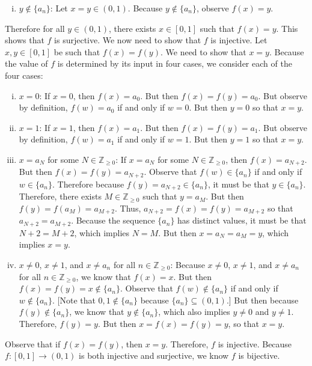 \documentclass[11pt,letterpaper]{article}
\begin{document}
\begin{enumerate}[(a)]
\begin{enumerate}[(i)]
	\item $y \notin \{ a_n \}$: Let $x= y \in (0, 1)$. Because $y \notin \{ a_n \}$, observe $f(x)= y$. 
	\end{enumerate}
Therefore for all $y \in (0, 1)$, there exists $x \in [0, 1]$ such that $f(x)= y$. This shows that $f$ is surjective. We now need to show that $f$ is injective. Let $x, y \in [0, 1]$ be such that $f(x)= f(y)$. We need to show that $x= y$. Because the value of $f$ is determined by its input in four cases, we consider each of the four cases:
	\begin{enumerate}[(i)]
	\item $x= 0$: If $x= 0$, then $f(x)= a_0$. But then $f(x)= f(y)= a_0$. But observe by definition, $f(w)= a_0$ if and only if $w= 0$. But then $y= 0$ so that $x= y$. 
	\item $x= 1$: If $x= 1$, then $f(x)= a_1$. But then $f(x)= f(y)= a_1$. But observe by definition, $f(w)= a_1$ if and only if $w= 1$. But then $y= 1$ so that $x= y$.
	\item $x= a_N$ for some $N \in \mathbb{Z}_{\geq 0}$: If $x= a_N$ for some $N \in \mathbb{Z}_{\geq 0}$, then $f(x)= a_{N + 2}$. But then $f(x)= f(y)= a_{N + 2}$. Observe that $f(w) \in \{ a_n \}$ if and only if $w \in \{ a_n \}$. Therefore because $f(y)= a_{N + 2} \in \{ a_n \}$, it must be that $y \in \{ a_n \}$. Therefore, there exists $M \in \mathbb{Z}_{\geq 0}$ such that $y= a_M$. But then $f(y)= f(a_M)= a_{M+ 2}$. Thus, $a_{N+ 2}= f(x)= f(y)= a_{M + 2}$ so that $a_{N + 2}= a_{M + 2}$. Because the sequence $\{ a_n \}$ has distinct values, it must be that $N + 2= M + 2$, which implies $N= M$. But then $x= a_N= a_M= y$, which implies $x= y$. 
	\item $x \neq 0$, $x \neq 1$, and $x \neq a_n$ for all $n \in \mathbb{Z}_{\geq 0}$: Because $x \neq 0$, $x \neq 1$, and $x \neq a_n$ for all $n \in \mathbb{Z}_{\geq 0}$, we know that $f(x)= x$. But then $f(x)= f(y)= x \notin \{ a_n \}$. Observe that $f(w) \notin \{ a_n \}$ if and only if $w \notin \{ a_n \}$. [Note that $0, 1 \notin \{ a_n \}$ because $\{ a_n \} \subseteq (0, 1)$.] But then because $f(y) \notin \{ a_n \}$, we know that $y \notin \{ a_n \}$, which also implies $y \neq 0$ and $y \neq 1$. Therefore, $f(y)= y$. But then $x= f(x)= f(y)= y$, so that $x= y$.
	\end{enumerate}
Observe that if $f(x)= f(y)$, then $x= y$. Therefore, $f$ is injective. Because $f: [0, 1] \to (0, 1)$ is both injective and surjective, we know $f$ is bijective. \pspace


\end{enumerate}
\end{document}
